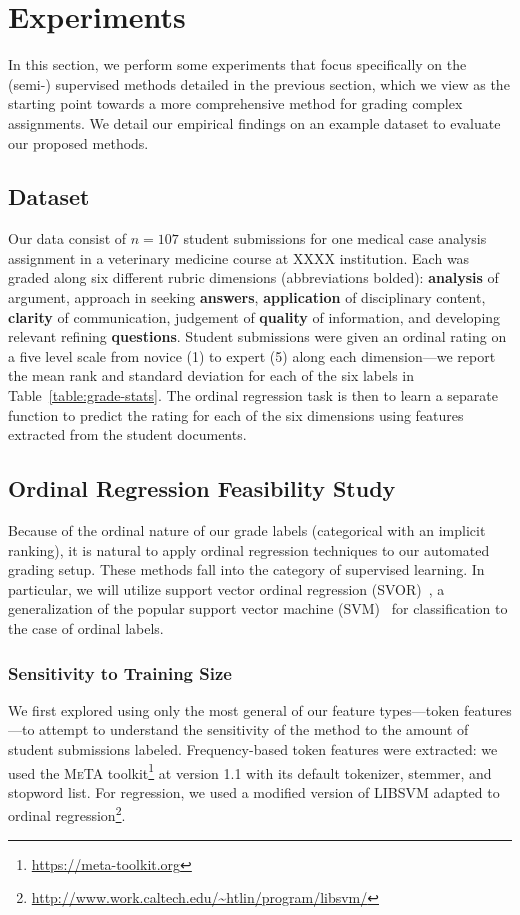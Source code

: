 \section{Experiments}

In this section, we perform some experiments that focus specifically on the
(semi-) supervised methods detailed in the previous section, which we view
as the starting point towards a more comprehensive method for grading
complex assignments. We detail our empirical findings on an example
dataset to evaluate our proposed methods.

\subsection{Dataset}

Our data consist of $n = 107$ student submissions for one medical case
analysis assignment in a veterinary medicine course at XXXX institution.
Each was graded along six different rubric dimensions (abbreviations
bolded): \textbf{analysis} of argument, approach in seeking
\textbf{answers}, \textbf{application} of disciplinary content,
\textbf{clarity} of communication, judgement of \textbf{quality} of
information, and developing relevant refining \textbf{questions}. Student
submissions were given an ordinal rating on a five level scale from novice
(1) to expert (5) along each dimension---we report the mean rank and
standard deviation for each of the six labels in
Table~\ref{table:grade-stats}. The ordinal regression task is then to
learn a separate function to predict the rating for each of the six
dimensions using features extracted from the student documents.



\subsection{Ordinal Regression Feasibility Study}

Because of the ordinal nature of our grade labels (categorical with an
implicit ranking), it is natural to apply ordinal regression techniques to
our automated grading setup. These methods fall into the category of
supervised learning. In particular, we will utilize support vector
ordinal regression (SVOR)~\cite{Chu:2007:SVOR}, a generalization of the
popular support vector machine (SVM)~\cite{Cortes:1995:SVM} for
classification to the case of ordinal labels.

\subsubsection{Sensitivity to Training Size}
We first explored using only the most general of our feature types---token
features---to attempt to understand the sensitivity of the method to the
amount of student submissions labeled. Frequency-based token features were
extracted: we used the \textsc{MeTA}
toolkit\footnote{\url{https://meta-toolkit.org}} at version 1.1
with its default tokenizer, stemmer, and stopword list. For regression, we
used a modified version of \textsc{LIBSVM} adapted to ordinal
regression\footnote{\url{http://www.work.caltech.edu/~htlin/program/libsvm/}}.

